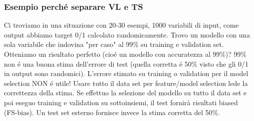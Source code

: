 \documentclass{article}
\begin{document}
\subsubsection{Esempio perché separare VL e TS}
Ci troviamo in una situazione con 20-30 esempi, 1000 variabili di input, come output abbiamo target 0/1 calcolato randomicamente. Trovo un modello con una sola variabile che indovina "per caso" al 99\% su training e validation set. Otteniamo un risultato perfetto (cioé un modello con accuratezza al 99\%)? 99\% non é una buona stima dell'errore di test (quella corretta é 50\% visto che gli 0/1 in output sono randomici). L'errore stimato su training o validation per il model selection NON é utile! Usare tutto il data set per feature/model selection lede la correttezza della stima. Se effettuo la selezione del modello su tutto il data set e poi eseguo training e validation su sottoinsiemi, il test fornirà risultati biased (FS-bias). Un test set esterno fornisce invece la stima corretta del 50\%.
\end{document}
